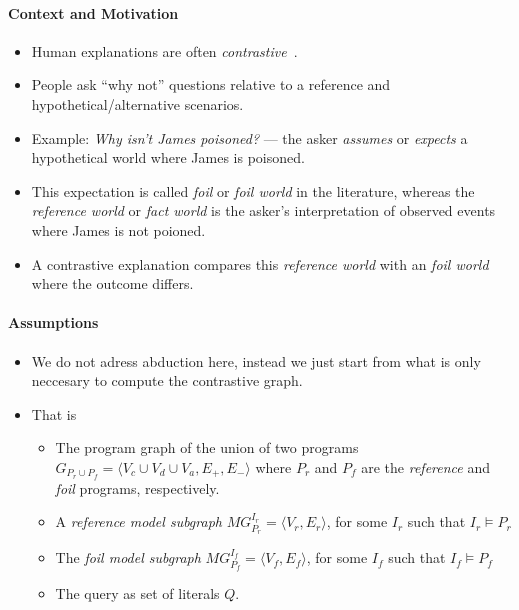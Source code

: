 \paragraph{Context and Motivation}
\begin{itemize}
  \item Human explanations are often \emph{contrastive}~\cite{miller19}.
  \item People ask “why not” questions relative to a reference and hypothetical/alternative scenarios.
  \item Example: \textit{Why isn’t James poisoned?} — the asker \emph{assumes} or \emph{expects} a hypothetical world where James is poisoned.
  \item This expectation is called \emph{foil} or \emph{foil world} in the literature, whereas the \emph{reference world} or \emph{fact world} is the asker’s interpretation of observed events where James is not poioned.
  \item A contrastive explanation compares this \emph{reference world} with an \emph{foil world} where the outcome differs.
\end{itemize}

\paragraph{Assumptions}
\begin{itemize}
  \item {\color{blue} We do not adress abduction here}, instead we just start from what is only neccesary to compute the contrastive graph.
  \item That is
  \begin{itemize}
    \item The program graph of the union of two programs $G_{P_r \cup P_f} = \langle V_c \cup V_d \cup V_a, E_{+}, E_{-} \rangle$ where $P_r$ and $P_f$ are the \emph{reference} and \emph{foil} programs, respectively.
    \item A \emph{reference model subgraph} $MG_{P_r}^{I_r} = \langle V_r, E_r \rangle$, for some $I_r$ such that $I_r \models P_r$
    \item The \emph{foil model subgraph} $MG_{P_f}^{I_f} = \langle V_f, E_f \rangle$, for some $I_f$ such that $I_f \models P_f$
    \item The query as set of literals $Q$.
  \end{itemize}
\end{itemize}

